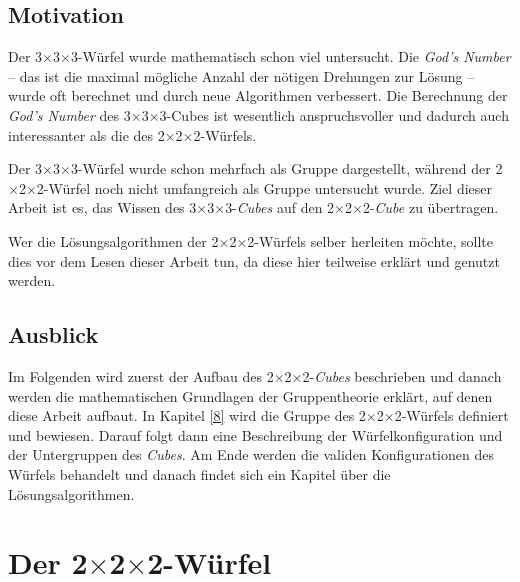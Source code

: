 \documentclass[12pt,a4paper, usenames, dvipsnames]{article}
\newcommand{\Ttwo}{2$\times$2$\times$2-}
\newcommand{\Tthree}{3$\times$3$\times$3-}
\begin{document}
%
%
%
%
%
%
%
%
\subsection*{Motivation} 




Der \Tthree Würfel wurde mathematisch schon viel untersucht. 
Die \textit{God's Number} -- das ist die maximal mögliche Anzahl der nötigen Drehungen zur Lösung -- wurde oft berechnet und durch neue Algorithmen verbessert. 
Die Berechnung der \textit{God's Number} des \Tthree Cubes ist wesentlich anspruchsvoller und dadurch auch interessanter als die des \Ttwo Würfels. 

Der \Tthree Würfel wurde schon mehrfach als Gruppe dargestellt, während der \Ttwo Würfel
noch nicht umfangreich als Gruppe untersucht wurde. Ziel dieser Arbeit ist es, das Wissen des \Tthree \textit{Cubes} auf den \Ttwo \textit{Cube} zu übertragen.

Wer die Lösungsalgorithmen der \Ttwo Würfels selber herleiten möchte, sollte dies vor dem Lesen dieser Arbeit tun, da diese hier teilweise erklärt und genutzt werden.

%
%
%
%
%
%
%
%
\subsection*{Ausblick} 

Im Folgenden wird zuerst der Aufbau des \Ttwo \textit{Cubes} beschrieben und danach werden die mathematischen Grundlagen der Gruppentheorie erklärt, auf denen diese Arbeit aufbaut. 
In Kapitel \ref{8} wird die Gruppe des \Ttwo Würfels definiert und bewiesen. 
Darauf folgt dann eine Beschreibung der Würfelkonfiguration und der Untergruppen des \textit{Cubes}. 
Am Ende werden die validen Konfigurationen des Würfels behandelt und danach findet sich ein Kapitel über die Lösungsalgorithmen.

%
%
%
%
%
%
%
%
%
%
%
%
\newpage
\section{Der \Ttwo Würfel}
\end{document}
